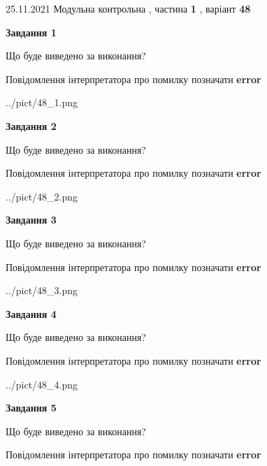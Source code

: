 \documentclass[10pt, ukrainian]{article}
\begin{document}
{25.11.2021 Модульна контрольна , частина \textbf { 1 }, варіант  \No \textbf { 48 }\par}
{
\begin {large}

{\begin {center}\textbf{Завдання 1}\end {center}}\par
Що буде виведено за виконання? \par
Повідомлення інтерпретатора про помилку позначати \textbf{error}

\begin{center}
	{../pict/48_1.png}
\end{center}
\newpage

{\begin {center}\textbf{Завдання 2}\end {center}}\par
Що буде виведено за виконання? \par
Повідомлення інтерпретатора про помилку позначати \textbf{error}

\begin{center}
	{../pict/48_2.png}
\end{center}
\newpage

{\begin {center}\textbf{Завдання 3}\end {center}}\par
Що буде виведено за виконання? \par
Повідомлення інтерпретатора про помилку позначати \textbf{error}

\begin{center}
	{../pict/48_3.png}
\end{center}
\newpage

{\begin {center}\textbf{Завдання 4}\end {center}}\par
Що буде виведено за виконання? \par
Повідомлення інтерпретатора про помилку позначати \textbf{error}

\begin{center}
	{../pict/48_4.png}
\end{center}
\newpage

{\begin {center}\textbf{Завдання 5}\end {center}}\par
Що буде виведено за виконання? \par
Повідомлення інтерпретатора про помилку позначати \textbf{error}


\end{large}}
\end{document}
